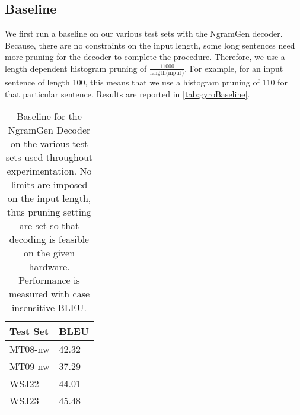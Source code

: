 \subsection{Baseline}
\label{sec:gyroBaseline}

We first run a baseline on our various test sets with the NgramGen decoder.
Because, there are no constraints on the input length, some long sentences
need more pruning for the decoder to complete the procedure.
Therefore, we use a length dependent histogram pruning of
$\frac{11000}{\text{length(input)}}$. For example, for an input sentence
of length 100, this means that we use a histogram pruning of 110 for that
particular sentence. Results are reported in \autoref{tab:gyroBaseline}.
%
\begin{table}
  \begin{center}
  \begin{tabular}{l|l}
    Test Set & BLEU \\
    \hline
    MT08-nw & 42.32 \\
    MT09-nw & 37.29 \\
    WSJ22 & 44.01 \\
    WSJ23 & 45.48 \\
  \end{tabular}
  \caption{Baseline for the NgramGen Decoder on the various test sets used throughout experimentation. No
    limits are imposed on the input length, thus pruning setting are set so that decoding is feasible on
    the given hardware. Performance is measured with case insensitive BLEU.}
  \label{tab:gyroBaseline}
  \end{center}
\end{table}


